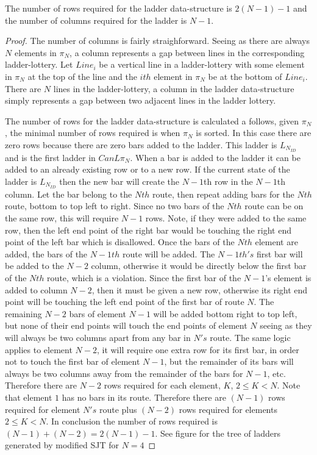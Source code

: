 \begin{theorem}
  The number of rows required for the ladder data-structure is $2(N-1) - 1$ and the number of columns required for 
  the ladder is $N-1$.
\end{theorem}
\begin{proof}
  The number of columns is fairly straighforward. Seeing as there are always $N$ elements in $\pi_{N}$, 
  a column represents a gap between lines in the corresponding ladder-lottery. Let $Line_{i}$ be a vertical line in a ladder-lottery 
  with some element in $\pi_{N}$ at the top of the line and the $ith$ element in $\pi_{N}$ be 
  at the bottom of $Line_{i}$. There are $N$ lines in the ladder-lottery, a column in the ladder data-structure
  simply represents a gap between two adjacent lines in the ladder lottery.\par 
  The number of rows for the ladder data-structure is calculated a follows, given $\pi_{N}$, the minimal 
  number of rows required is when $\pi_{N}$ is sorted. In this case there are zero rows because there are 
  zero bars added to the ladder. This ladder is $L_{N_{ID}}$ and is 
  the first ladder in $CanL{\pi_{N}}$. When a bar is added to the ladder it can be added to an already existing row 
  or to a new row. If the current state of the ladder is $L_{N_{ID}}$ then the new bar will create the $N-1$th row in the 
  $N-1$th column. Let the bar belong to the $Nth$ route, then repeat adding bars for the $Nth$ route, bottom to top left to right. 
  Since no two bars of the $Nth$ route can be on the same row, this will require $N-1$ rows. Note, if they were added to the same 
  row, then the left end point of the right bar would be touching the right end point of the left bar which is disallowed. Once the 
  bars of the $Nth$ element are added, the bars of the $N-1th$ route will be added. The $N-1th's$ first bar 
  will be added to the $N-2$ column, otherwise it would be directly below the first bar of the $Nth$ route, which is a violation. 
  Since the first bar of the $N-1$'s element is added to column $N-2$, then it must be given a new row, otherwise its right end point 
  will be touching  the left end point of the first bar of route $N$. The remaining $N-2$ bars of element $N-1$
  will be added bottom right to top left, but none of their end points will touch the end points of element $N$ seeing as they will 
  always be two columns apart from any bar in $N's$ route. The same logic applies to element $N-2$, it will require one extra row for its 
  first bar, in order not to touch the first bar of element $N-1$, but the remainder of its bars will always be two columns away from 
  the remainder of the bars for $N-1$, etc. Therefore there are $N-2$ rows required for each element, $K$,  $2 \leq K < N$. Note that element 
  $1$ has no bars in its route. Therefore there are $(N-1)$ rows required for element $N's$ route plus $(N-2)$ rows required for 
  elements $2 \leq K < N$. In conclusion the number of rows required is $(N-1) + (N-2) = 2(N-1)-1$. See figure for the tree of ladders 
  generated by modified SJT for $N=4$
\end{proof}




